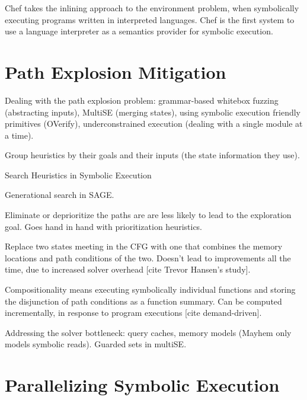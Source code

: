 Chef takes the inlining approach to the environment problem, when symbolically executing programs written in interpreted languages.  Chef is the first system to use a language interpreter as a semantics provider for symbolic execution.



\iffalse
\section{Path Explosion Mitigation}
\label{sec:relwork:pathexpl}

Dealing with the path explosion problem: grammar-based whitebox fuzzing (abstracting inputs), MultiSE (merging states), using symbolic execution friendly primitives (OVerify), underconstrained execution (dealing with a single module at a time).

Group heuristics by their goals and their inputs (the state information they use).

Search Heuristics in Symbolic Execution

Generational search in SAGE.

Eliminate or deprioritize the paths are are less likely to lead to the exploration goal.  Goes hand in hand with prioritization heuristics.

Replace two states meeting in the CFG with one that combines the memory locations and path conditions of the two.  Doesn't lead to improvements all the time, due to increased solver overhead [cite Trevor Hansen's study].

Compositionality means executing symbolically individual functions and storing the disjunction of path conditions as a function summary.  Can be computed incrementally, in response to program executions [cite demand-driven].

Addressing the solver bottleneck: query caches, memory models (Mayhem only models symbolic reads). Guarded sets in multiSE.

\section{Parallelizing Symbolic Execution}
\label{sec:relwork:parsymbex}

